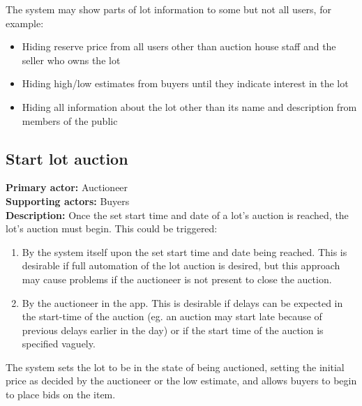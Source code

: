 \documentclass[titlepage, 12pt]{extarticle}
\begin{document}
The system may show parts of lot information to some but not all users, for example:
\begin{itemize}
  \item Hiding reserve price from all users other than auction house staff and the seller who owns the lot
  \item Hiding high/low estimates from buyers until they indicate interest in the lot
  \item Hiding all information about the lot other than its name and description from members of the public
\end{itemize}
\subsection{Start lot auction}
{\bf Primary actor: } Auctioneer
\\{\bf Supporting actors: } Buyers
\\{\bf Description: } Once the set start time and date of a lot's auction is reached, the lot's auction must begin. This could be triggered:
\begin{enumerate}
\item By the system itself upon the set start time and date being reached. This is desirable if full automation of the lot auction is desired, but this approach may cause problems if the auctioneer is not present to close the auction. 
\item By the auctioneer in the app. This is desirable if delays can be expected in the start-time of the auction (eg. an auction may start late because of previous delays earlier in the day) or if the start time of the auction is specified vaguely. 
\end{enumerate}

The system sets the lot to be in the state of being auctioned, setting the initial price as decided by the auctioneer or the low estimate, and allows buyers to begin to place bids on the item. 
\newpage
\end{document}

